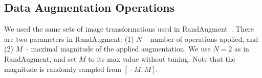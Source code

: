 \documentclass[runningheads]{llncs}
\begin{document}
\begin{table*}[h]
\centering
\renewcommand{\arraystretch}{1.2}
\caption{Hyper-parameters and their meanings.}
\label{table:hyperparameters}
\end{table*}

\subsection{Data Augmentation Operations}

We used the same sets of image transformations used in RandAugment~\cite{cubuk2019randaugment}.
There are two parameters in RandAugment: (1) $N$ -- number of operations applied, and (2) $M$ -- maximal magnitude of the applied augmentation.
We use $N=2$ as in RandAugment, and set $M$ to its max value without tuning.
Note that the magnitude is randomly sampled from $[-M, M]$. 


\end{document}
